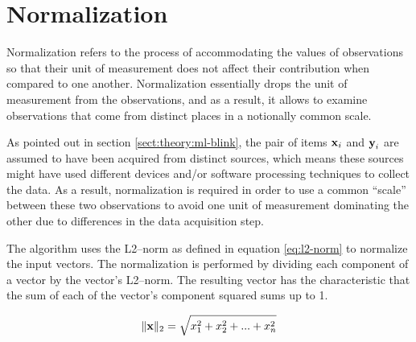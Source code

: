\section{Normalization} \label{sect:theory:norm}

Normalization refers to the process of accommodating the values of observations so that their unit of measurement does not affect their contribution when compared to one another. Normalization essentially drops the unit of measurement from the observations, and as a result, it allows to examine observations that come from distinct places in a notionally common scale.  \newline

As pointed out in section \ref{sect:theory:ml-blink}, the pair of items $\boldsymbol{\mathbf{x}}_i$ and $\boldsymbol{\mathbf{y}}_i$ are assumed to have been acquired from distinct sources, which means these sources might have used different devices and/or software processing techniques to collect the data. As a result, normalization is required in order to use a common ``scale'' between these two observations to avoid one unit of measurement dominating the other due to differences in the data acquisition step. \newline

The \mlblink algorithm uses the L2--norm as defined in equation \ref{eq:l2-norm} to normalize the input vectors. The normalization is performed by dividing each component of a vector by the vector's L2--norm. The resulting vector has the characteristic that the sum of each of the vector's component squared sums up to 1.

\begin{equation} \label{eq:l2-norm}
    \lVert \boldsymbol{\mathbf{x}} \rVert_{2} = \sqrt{x^2_1 + x^2_2 + ... + x^2_n}
\end{equation}